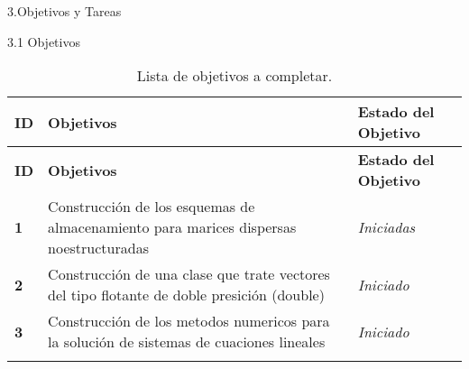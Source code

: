 \documentclass[12pt]{report}
\numberwithin{equation}{section}
\begin{document}
\begin{flushleft}
\large{3.Objetivos y Tareas}\\
\vspace{1em}


\large{3.1 Objetivos}\\
\vspace{1em}

\begin{longtable}[H]{|m{0.5cm}|m{7cm}|m{5.5cm}|}
\hline
\small{\textbf{ID}} & \small{\textbf{Objetivos}} & \small{\textbf{Estado del Objetivo}} \\
\hline \hline
\endfirsthead
\hline
\small{\textbf{ID}} & \small{\textbf{Objetivos}} & \small{\textbf{Estado del Objetivo}} \\
\hline \hline
\endhead
\hline
\endfoot

\endlastfoot
\textbf{1}  & \small{Construcci\'on de los esquemas de almacenamiento para marices dispersas noestructuradas} & \small{\textit{Iniciadas}}\\
\hline 
\textbf{2}  & \small{Construcci\'on de una clase que trate vectores del tipo flotante de doble presici\'on (double)} & \small{\textit{Iniciado}}\\
\hline 
\textbf{3}  & \small{Construcci\'on de los metodos numericos para la soluci\'on de sistemas de cuaciones lineales} & \small{\textit{Iniciado}}\\
\hline
\hline
\caption{{\footnotesize Lista de objetivos a completar.}}
\label{tabla: TABLA CE quinta plan}
\end{longtable}



\end{flushleft}
\end{document}
